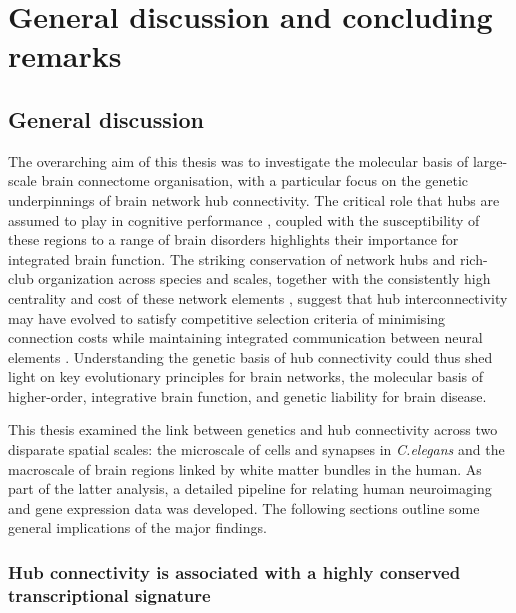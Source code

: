 \chapter{General discussion and concluding \\ remarks}
\label{ch:Discussion}

\section{General discussion}
The overarching aim of this thesis was to investigate the molecular basis of large-scale brain connectome organisation, with a particular focus on the genetic underpinnings of brain network hub connectivity. The critical role that hubs are assumed to play in cognitive performance \citep{Buckner2009}, coupled with the susceptibility of these regions to a range of brain disorders \citep{Bassett2009a,Crossley2014,Fornito2015} highlights their importance for integrated brain function. The striking conservation of network hubs and rich-club organization across species and scales, together with the consistently high centrality and cost of these network elements \citep{VandenHeuvel2016}, suggest that hub interconnectivity may have evolved to satisfy competitive selection criteria of minimising connection costs while maintaining integrated communication between neural elements \citep{Bullmore2012}. Understanding the genetic basis of hub connectivity could thus shed light on key evolutionary principles for brain networks, the molecular basis of higher-order, integrative brain function, and genetic liability for brain disease.

This thesis examined the link between genetics and hub connectivity across two disparate spatial scales: the microscale of cells and synapses in \textit{C.elegans} and the macroscale of brain regions linked by white matter bundles in the human. As part of the latter analysis, a detailed pipeline for relating human neuroimaging and gene expression data was developed. The following sections outline some general implications of the major findings.

\subsection*{Hub connectivity is associated with a highly conserved transcriptional signature}

